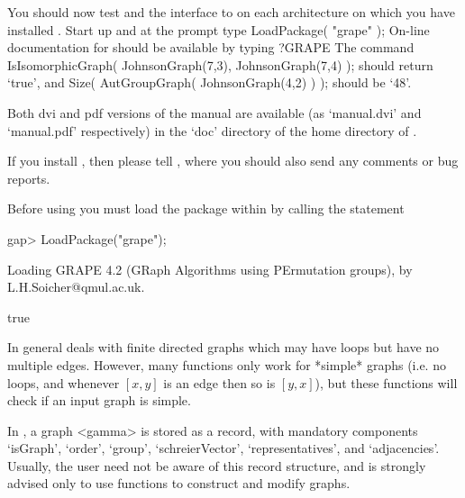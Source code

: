 You should now test {\GRAPE} and the interface to {\nauty} on each
architecture on which you have installed {\GRAPE}. Start up {\GAP}
and at the prompt type
\begintt
LoadPackage( "grape" );
\endtt
On-line documentation for {\GRAPE} should be available by typing 
\begintt
?GRAPE
\endtt
The command
\begintt
IsIsomorphicGraph( JohnsonGraph(7,3), JohnsonGraph(7,4) );
\endtt
should return `true', and 
\begintt
Size( AutGroupGraph( JohnsonGraph(4,2) ) );
\endtt
should be `48'.

Both dvi and pdf versions of the {\GRAPE} manual are available
(as `manual.dvi' and `manual.pdf' respectively) in the `doc' directory
of the home directory of {\GRAPE}.

If you install {\GRAPE}, then please tell ,
where you should also send any comments or bug reports.


Before using {\GRAPE} you must load the package within {\GAP} by calling 
the statement

\begintt
gap> LoadPackage("grape");

Loading  GRAPE 4.2  (GRaph Algorithms using PErmutation groups),
by L.H.Soicher@qmul.ac.uk.

true
\endtt

 
In general {\GRAPE} deals with finite directed graphs which may have
loops but have no multiple edges. However, many {\GRAPE} functions only
work for *simple* graphs (i.e. no loops, and whenever $[x,y]$ is an
edge then so is $[y,x]$), but these functions will check if an input
graph is simple.

In {\GRAPE}, a graph <gamma> is stored as a record, with mandatory
components `isGraph', `order', `group', `schreierVector',
`representatives', and `adjacencies'. Usually, the user need not be
aware of this record structure, and is strongly advised only to use
{\GRAPE} functions to construct and modify graphs.


